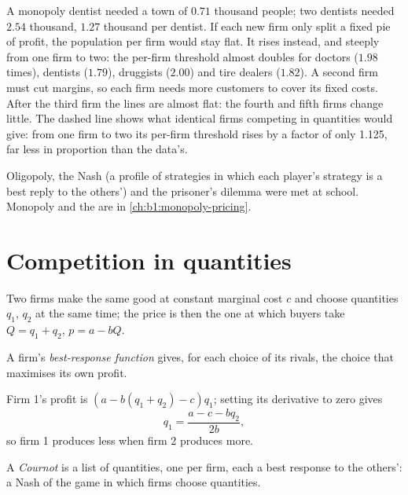 A monopoly dentist needed a town of $0.71$ thousand people; two dentists
needed $2.54$ thousand, $1.27$ thousand per dentist. %
If each new firm only split a fixed pie of profit, the population per firm
would stay flat. It rises instead, and steeply from one firm to two: the
per-firm threshold almost doubles for doctors ($1.98$ times), dentists
($1.79$), druggists ($2.00$) and tire dealers ($1.82$). %
A second firm must cut margins, so each firm needs more customers to cover
its fixed costs. After the third firm the lines are almost flat: the fourth
and fifth firms change little. The dashed line shows what identical
firms competing in quantities would give: from one firm to two its
per-firm threshold rises by a factor of only 1.125, far less in proportion
than the data's.

\begin{recall}
Oligopoly, the Nash  (a profile of strategies in which each
player's strategy is a best reply to the others') and the prisoner's
dilemma were met at school. Monopoly and the  are in
\cref{ch:b1:monopoly-pricing}.
\end{recall}

\section{Competition in quantities}\label{sec:b1:cournot-and-bertrand:cournot}

Two firms make the same good at constant marginal cost $c$ and choose
quantities $q_1$, $q_2$ at the same time; the price is then the one at which
buyers take $Q = q_1 + q_2$, $p = a - bQ$.

\begin{definition}\label{def:b1:cournot-and-bertrand:best-response}
A firm's \emph{best-response function} gives, for each choice of its rivals,
the choice that maximises its own profit.
\end{definition}

Firm 1's profit is $(a - b(q_1 + q_2) - c)q_1$; setting its derivative to zero gives
\[
q_1 = \frac{a - c - bq_2}{2b},
\]
so firm 1 produces less when firm 2 produces more.

\begin{definition}\label{def:b1:cournot-and-bertrand:cournot}
A \emph{Cournot } is a list of quantities, one per firm, each a
best response to the others': a Nash  of the game in which
firms choose quantities.
\end{definition}

